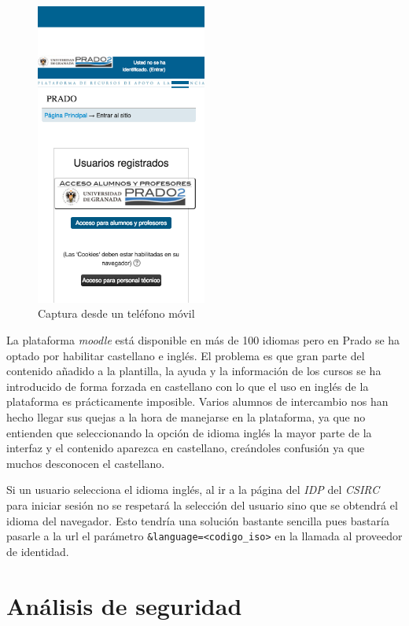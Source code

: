 \begin{figure}[H]
\centering
\includegraphics[width=0.5\textwidth]{../screenshots/capturamovil2}
\caption{Captura desde un teléfono móvil}
\label{fig:capturamovil2}
\end{figure}

\bigskip
La plataforma \textit{moodle} está disponible en más de 100 idiomas pero en Prado se ha optado por habilitar castellano e inglés. El problema es que gran parte del contenido añadido a la plantilla, la ayuda y la información de los cursos se ha introducido de forma forzada en castellano con lo que el uso en inglés de la plataforma es prácticamente imposible. Varios alumnos de intercambio nos han hecho llegar sus quejas a la hora de manejarse en la plataforma, ya que no entienden que seleccionando la opción de idioma inglés la mayor parte de la interfaz y el contenido aparezca en castellano, creándoles confusión ya que muchos desconocen el castellano.

\bigskip
Si un usuario selecciona el idioma inglés, al ir a la página del \textit{IDP} del \textit{CSIRC} para iniciar sesión no se respetará la selección del usuario sino que se obtendrá el idioma del navegador. Esto tendría una solución bastante sencilla pues bastaría pasarle a la url el parámetro \texttt{\&language=<codigo\_iso>} en la llamada al proveedor de identidad.


\section{Análisis de seguridad}

